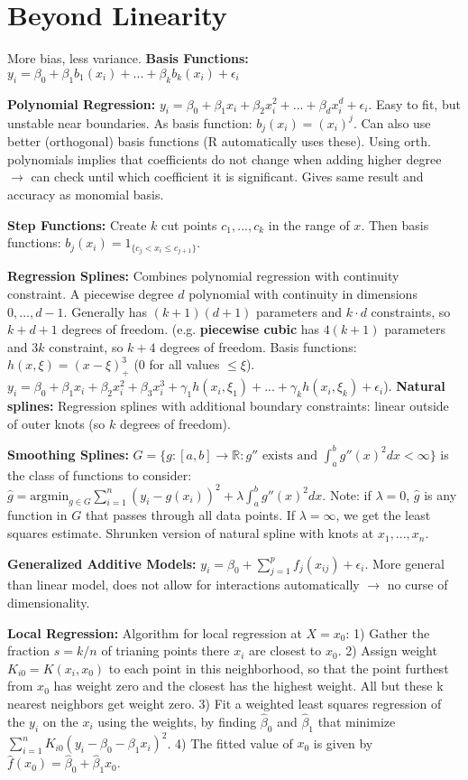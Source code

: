 \section*{Beyond Linearity}
More bias, less variance. 
\textbf{Basis Functions:} $y_i = \beta_0 + \beta_1 b_1(x_i) + ... + \beta_k b_k(x_i) + \epsilon_i$

\textbf{Polynomial Regression:}
$y_i=\beta_0+\beta_1 x_i + \beta_2 x_i^2 +...+\beta_d x_i^d + \epsilon_i$.
Easy to fit, but unstable near boundaries.
As basis function: $b_j(x_i) = (x_i)^j$.
Can also use better (orthogonal) basis functions (R automatically uses these). 
Using orth. polynomials implies that coefficients do not change when adding higher degree $\rightarrow$ can check until which coefficient it is significant. 
Gives same result and accuracy as monomial basis.

\textbf{Step Functions:}
Create $k$ cut points $c_1,...,c_k$ in the range of $x$. Then basis functions: $b_j(x_i) = \mathds{}{1}_{\{ c_j < x_i \leq c_{j+1}\}}$.

\textbf{Regression Splines:}
Combines polynomial regression with continuity constraint.
A piecewise degree $d$ polynomial with continuity in dimensions $0, ..., d-1$.
Generally has $(k+1)(d+1)$ parameters and $k\cdot d$ constraints, so $k+d+1$ degrees of freedom.
(e.g. \textbf{piecewise cubic} has $4(k+1)$ parameters and $3k$ constraint, so $k+4$ degrees of freedom. Basis functions: $h(x, \xi)=(x-\xi)_+^3$
($0$ for all values $\leq \xi$). $y_i = \beta_0 + \beta_1 x_i + \beta_2 x_i^2 + \beta_3 x_i^3 + \gamma_1 h(x_i, \xi_1) + ... + \gamma_k h(x_i, \xi_k) + \epsilon_i$).
\textbf{Natural splines:} Regression splines with additional boundary constraints: linear outside of outer knots (so $k$ degrees of freedom).

\textbf{Smoothing Splines:} $G=\{ g:[a,b]\to \mathbb{R}: g'' \text{ exists and } \int_a^b g''(x)^2 dx < \infty \}$ is the class of functions to consider: $\hat g = \text{argmin}_{g\in G} \sum_{i=1}^n (y_i - g(x_i))^2 + \lambda \int_a^b g''(x)^2 dx$.
Note: if $\lambda = 0$, $\hat g$ is any function in $G$ that passes through all data points. If $\lambda=\infty$, we get the least squares estimate. Shrunken version of natural spline with knots at $x_1, ..., x_n$.

\textbf{Generalized Additive Models:} $y_i = \beta_0 + \sum_{j=1}^p f_j(x_{ij}) + \epsilon_i$. More general than linear model, does not allow for interactions automatically $\to$ no curse of dimensionality.

\textbf{Local Regression:} Algorithm for local regression at $X=x_0$: 1) Gather the fraction $s=k/n$ of trianing points there $x_i$ are closest to $x_0$. 2) Assign weight $K_{i0}=K(x_i, x_0)$ to each point in this neighborhood, so that the point furthest from $x_0$ has weight zero and the closest has the highest weight. All but these k nearest neighbors get weight zero. 3) Fit a weighted least squares regression of the $y_i$ on the $x_i$ using the weights, by finding $\hat\beta_0$ and $\hat\beta_1$ that minimize $\sum_{i=1}^n K_{i0}(y_i-\beta_0-\beta_1 x_i)^2$. 4) The fitted value of $x_0$ is given by $\hat f (x_0) = \hat\beta_0 + \hat\beta_1 x_0$.

